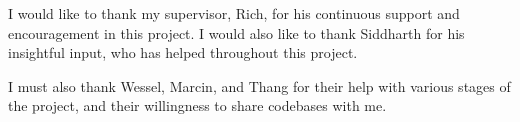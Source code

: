 
\begin{acknowledgements}      


I would like to thank my supervisor, Rich, for his continuous support and encouragement in this project. I would also like to thank Siddharth for his insightful input, who has helped throughout this project.

I must also thank Wessel, Marcin, and Thang for their help with various stages of the project, and their willingness to share codebases with me.

\end{acknowledgements}
